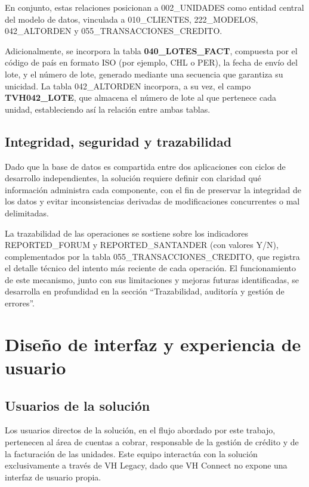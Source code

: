 En conjunto, estas relaciones posicionan a 002\_UNIDADES como entidad central del modelo de datos, vinculada a 010\_CLIENTES, 222\_MODELOS, 042\_ALTORDEN y 055\_TRANSACCIONES\_CREDITO.

Adicionalmente, se incorpora la tabla \textbf{040\_LOTES\_FACT}, compuesta por el código de país en formato ISO (por ejemplo, CHL o PER), la fecha de envío del lote, y el número de lote, generado mediante una secuencia que garantiza su unicidad. La tabla 042\_ALTORDEN incorpora, a su vez, el campo \textbf{TVH042\_LOTE}, que almacena el número de lote al que pertenece cada unidad, estableciendo así la relación entre ambas tablas.

\subsection{Integridad, seguridad y trazabilidad}

Dado que la base de datos es compartida entre dos aplicaciones con ciclos de desarrollo independientes, la solución requiere definir con claridad qué información administra cada componente, con el fin de preservar la integridad de los datos y evitar inconsistencias derivadas de modificaciones concurrentes o mal delimitadas.

La trazabilidad de las operaciones se sostiene sobre los indicadores REPORTED\_FORUM y REPORTED\_SANTANDER (con valores Y/N), complementados por la tabla 055\_TRANSACCIONES\_CREDITO, que registra el detalle técnico del intento más reciente de cada operación. El funcionamiento de este mecanismo, junto con sus limitaciones y mejoras futuras identificadas, se desarrolla en profundidad en la sección ``Trazabilidad, auditoría y gestión de errores''.

\section{Diseño de interfaz y experiencia de usuario}

\subsection{Usuarios de la solución}

Los usuarios directos de la solución, en el flujo abordado por este trabajo, pertenecen al área de cuentas a cobrar, responsable de la gestión de crédito y de la facturación de las unidades. Este equipo interactúa con la solución exclusivamente a través de VH Legacy, dado que VH Connect no expone una interfaz de usuario propia.

